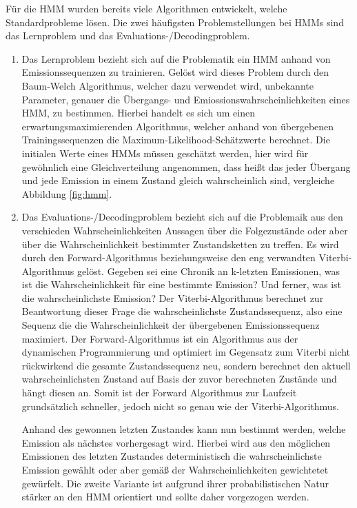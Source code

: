 Für die HMM wurden bereits viele Algorithmen entwickelt, welche Standardprobleme lösen.
Die zwei häufigsten Problemstellungen bei HMMs sind das Lernproblem und das Evaluations-/Decodingproblem.
\begin{enumerate}
	\item Das Lernproblem bezieht sich auf die Problematik ein HMM anhand von Emissionssequenzen zu trainieren. Gelöst wird dieses Problem durch den Baum-Welch Algorithmus, welcher dazu verwendet wird, unbekannte Parameter, genauer die Übergangs- und Emiossionswahrscheinlichkeiten eines HMM, zu bestimmen.
 Hierbei handelt es sich um einen erwartungsmaximierenden Algorithmus, welcher anhand von übergebenen Trainingssequenzen die Maximum-Likelihood-Schätzwerte berechnet.
 Die initialen Werte eines HMMs müssen geschätzt werden, hier wird für gewöhnlich eine Gleichverteilung angenommen, dass heißt das jeder Übergang und jede Emission in einem Zustand gleich wahrscheinlich sind, vergleiche Abbildung \ref{fig:hmm}.
	\item Das Evaluations-/Decodingproblem bezieht sich auf die Problemaik aus den verschieden Wahrscheinlichkeiten Aussagen über die Folgezustände oder aber über die Wahrscheinlichkeit bestimmter Zustandsketten zu treffen.
Es wird durch den Forward-Algorithmus beziehungsweise den eng verwandten Viterbi-Algorithmus gelöst.
Gegeben sei eine Chronik an k-letzten Emissionen, was ist die Wahrscheinlichkeit für eine bestimmte Emission? Und ferner, was ist die wahrscheinlichste Emission? Der Viterbi-Algorithmus berechnet zur Beantwortung dieser Frage die wahrscheinlichste Zustandssequenz, also eine Sequenz die die Wahrscheinlichkeit der übergebenen Emissionssequenz maximiert.
Der Forward-Algorithmus ist ein Algorithmus aus der dynamischen Programmierung und optimiert im Gegensatz zum Viterbi nicht rückwirkend die gesamte Zustandssequenz neu, sondern berechnet den aktuell wahrscheinlichsten Zustand auf Basis der zuvor berechneten Zustände und hängt diesen an.
Somit ist der Forward Algorithmus zur Laufzeit grundsätzlich schneller, jedoch nicht so genau wie der Viterbi-Algorithmus.

Anhand des gewonnen letzten Zustandes kann nun bestimmt werden, welche Emission als nächstes vorhergesagt wird. Hierbei wird aus den möglichen Emissionen des letzten Zustandes deterministisch die wahrscheinlichste Emission gewählt oder aber gemäß der Wahrscheinlichkeiten gewichtetet gewürfelt. Die zweite Variante ist aufgrund ihrer probabilistischen Natur stärker an den HMM orientiert und sollte daher vorgezogen werden.
 \end{enumerate}


